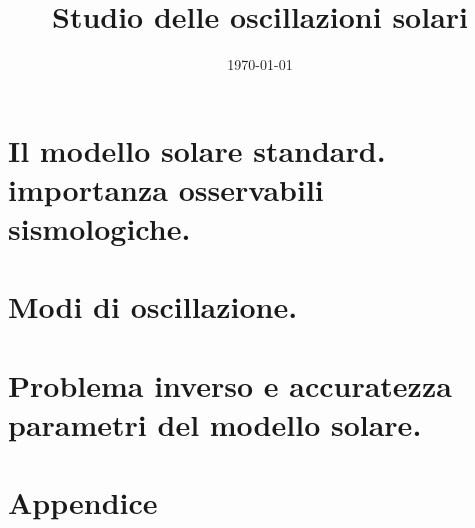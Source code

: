 \documentclass[oneside,11pt,fleqn]{memoir}%
\author{ }
\title{Studio delle oscillazioni solari}
\date{\today}
\begin{document}
\frontmatter
{}
\maketitle

\tableofcontents

\clearpage

\thispagestyle{empty}



\clearpage

\mainmatter
{}

\part{Il modello solare standard. importanza osservabili sismologiche.}




\part{Modi di oscillazione.}



\part{Problema inverso e accuratezza parametri del modello solare.}



\backmatter


\appendix

\part{Appendice}



\restoregeometry

\printbibliography
\end{document}
